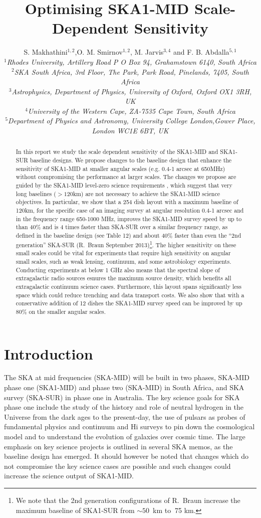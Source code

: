 \documentclass[sfheadings,a4paper,times,9pt,floats,floatfix]{article}
\title{Optimising SKA1-MID Scale-Dependent Sensitivity}
\author{S. Makhathini$^{1,2}$,O. M. Smirnov$^{1,2}$, M. Jarvis$^{3,4}$ and F. B. Abdalla$^{5,1}$ \\
{\footnotesize \it $^1$Rhodes University, Artillery Road P O Box 94, Grahamstown 6140, South Africa} \\
{\footnotesize \it $^2$SKA South Africa, 3rd Floor, The Park, Park Road, Pinelands, 7405, South Africa} \\
{\footnotesize \it $^3$Astrophysics, Department of Physics, University of Oxford, Oxford OX1 3RH, UK} \\ 
{\footnotesize \it $^4$University of the Western Cape, ZA-7535 Cape Town, South Africa}\\ 
{\footnotesize \it $^5$Department of Physics and Astronomy, University College London,Gower Place, London WC1E 6BT, UK}}
\begin{document}
\maketitle
\begin{abstract}
In this report we study the scale dependent sensitivity of the SKA1-MID and SKA1-SUR baseline designs. We propose
changes to the baseline design that enhance the sensitivity of SKA1-MID at smaller angular scales (e.g. 0.4-1 arcsec at
650MHz) without compromising the performance at larger scales. The changes we propose are guided by the SKA1-MID
level-zero science requirements \cite{srd}, which suggest that very long baselines ($>120$km) are not necessary to
achieve the SKA1-MID science objectives. In particular, we show that a 254 dish layout with a maximum baseline of 120km,
for the specific case of an imaging survey at angular resolution 0.4-1 arcsec and in the frequency range 650-1000 MHz,
improves the SKA1-MID survey speed by up to than 40\% and is 4 times faster than SKA-SUR over a similar frequency range,
as defined in the baseline design (see Table 12) and about 40\% faster than even the ``2nd generation'' SKA-SUR (R.~Braun September 2013)\footnote{We note
that the 2nd generation configurations of R.~Braun increase the maximum baseline of SKA1-SUR from $\sim 50$~km
to $~$75 km.}. The higher sensitivity on these small scales could be vital for experiments that require high sensitivity
on angular small scales, such as weak lensing, continuum, and some astrobiology experiments. Conducting experiments at 
below 1 GHz also means that the spectral slope of extragalactic radio sources
esnures the maximum source density, which benefits all extragalactic continuum science cases.
Furthermore, this layout spans significantly less space which could reduce trenching and data transport costs. 
We also show that with a conservative addition of 12 dishes the SKA1-MID survey speed can be improved by up 80\% on the
smaller angular scales.

\end{abstract}

\section{Introduction}
The SKA at mid frequencies (SKA-MID) will be built in two phases, SKA-MID phase one (SKA1-MID) and phase two (SKA-MID)
in South Africa, and SKA survey (SKA-SUR) in phase one in Australia. The key science goals for SKA phase one include the
study of the history and role of neutral hydrogen in the Universe from the dark ages to the present-day, the use of
pulsars as probes of fundamental physics \cite{bd} and continuum and H{\sc i} surveys to pin down the cosmological
model and to understand the evolution of galaxies over cosmic time. The large emphasis on key science projects is outlined in several SKA memos, as the baseline design has emerged.
It should however be noted that changes which do not compromise the key science cases are possible and such changes
could increase the science output of SKA1-MID.
\end{document}

